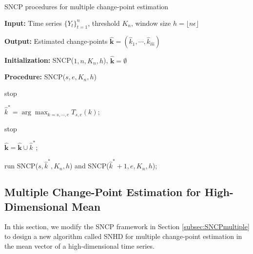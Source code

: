 \begin{algorithm}
	\caption{SNCP procedures for multiple change-point  estimation}\label{alg:one}
	\textbf{Input:} Time series $\{Y_t\}_{t=1}^n$, threshold $K_n$, window size $h=\lfloor n\epsilon\rfloor$
	
	\textbf{Output:} Estimated change-points $\widehat{\mathbf{k}}=(\hat{k}_1,\cdots,\hat{k}_{\hat{m}})$
	
	\textbf{Initialization:} SNCP($1,n,K_n,h$), $\widehat{\mathbf k}=\emptyset$
	
	\textbf{Procedure:} SNCP($s,e,K_n,h$)
	
	{
		stop
	}{
		$\hat{k}^*=\arg\max_{k=s,\cdots,e}T_{s,e}(k)$;
		
		{
			stop
		}{
			$\widehat{\mathbf{k}}=\widehat{\mathbf{k}}\cup\hat{k}^\ast$;
			
			run SNCP($s,\hat{k}^\ast,K_n,h$) and SNCP($\hat{k}^\ast+1,e,K_n,h$);
		}
	}

\end{algorithm}


\subsection{Multiple Change-Point Estimation for High-Dimensional Mean}\label{subsec:SNHD}
In this section, we modify the SNCP framework in Section \ref{subsec:SNCPmultiple} to design a new algorithm called SNHD for multiple change-point estimation in the mean vector of a high-dimensional time series.

